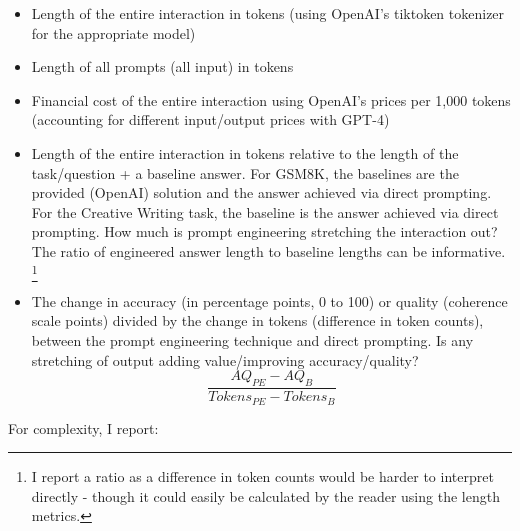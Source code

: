 \documentclass[11pt]{article}
\begin{document}
\begin{itemize}
  \item Length of the entire interaction in tokens (using OpenAI's tiktoken tokenizer for the appropriate model)
  \item Length of all prompts (all input) in tokens
  \item Financial cost of the entire interaction using OpenAI's prices per 1,000 tokens (accounting for different input/output prices with GPT-4)
  \item Length of the entire interaction in tokens relative to the length of the task/question + a baseline answer. For GSM8K, the baselines are the provided (OpenAI) solution and the answer achieved via direct prompting. For the Creative Writing task, the baseline is the answer achieved via direct prompting. How much is prompt engineering stretching the interaction out? The ratio of engineered answer length to baseline lengths can be informative. \footnote{I report a ratio as a difference in token counts would be harder to interpret directly - though it could easily be calculated by the reader using the length metrics.}
  \item The change in accuracy (in percentage points, 0 to 100) or quality (coherence scale points) divided by the change in tokens (difference in token counts), between the prompt engineering technique and direct prompting. Is any stretching of output adding value/improving accuracy/quality?
  \begin{displaymath}
    \frac{AQ_{PE} - AQ_{B}}{Tokens_{PE} - Tokens_{B}}
  \end{displaymath}
\end{itemize}

For complexity, I report:
\end{document}
